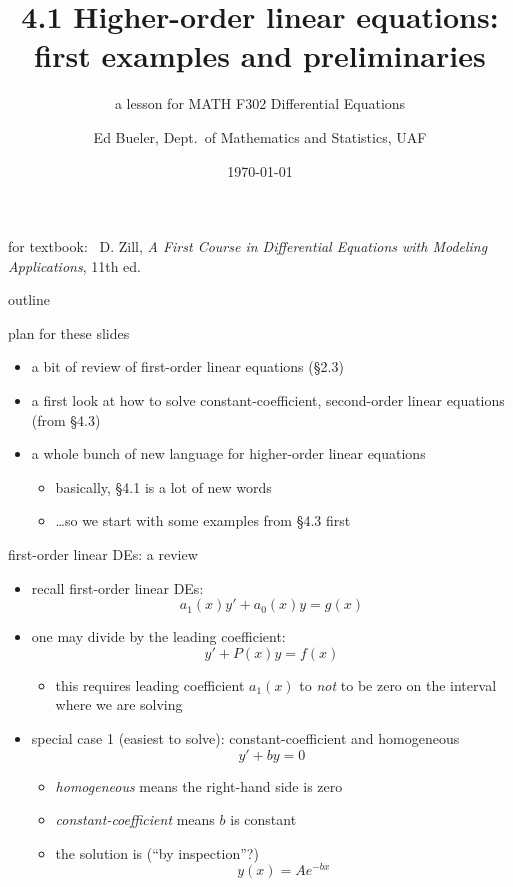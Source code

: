 \documentclass{beamer}
\title{4.1 Higher-order linear equations: \\ first examples and preliminaries}
\subtitle{a lesson for MATH F302 Differential Equations}
\author{Ed Bueler, Dept.~of Mathematics and Statistics, UAF}
\date{\tiny \today}
\begin{document}


\begin{frame}
\titlepage

\centerline{\tiny for textbook: \, D. Zill, \emph{A First Course in Differential Equations with Modeling Applications}, 11th ed.}
\end{frame}


\begin{frame}{outline}

plan for these slides
\begin{itemize}
\item a bit of review of first-order linear equations (\S2.3)
\item a first look at how to solve constant-coefficient, second-order linear equations (from \S4.3)
\item a whole bunch of new language for higher-order linear equations
    \begin{itemize}
    \item basically, \S4.1 is a lot of new words
    \item \dots so we start with some examples from \S4.3 first
    \end{itemize}
\end{itemize}
\end{frame}


\begin{frame}{first-order linear DEs: a review}

\begin{itemize}
\item recall first-order linear DEs:
    $$a_1(x) y' + a_0(x) y = g(x)$$
\item one may divide by the leading coefficient:
    $$y' + P(x) y = f(x)$$

    \begin{itemize}
    \item \alert{this requires leading coefficient $a_1(x)$ to \emph{not} to be zero} on the interval where we are solving
    \end{itemize}
\item special case 1 (\alert{easiest to solve}): constant-coefficient and homogeneous
    $$y' + b y = 0$$

    \begin{itemize}
    \item \emph{homogeneous} means the right-hand side is zero
    \item \emph{constant-coefficient} means $b$ is constant
    \item the solution is (``by inspection''?)
        $$y(x) = A e^{-bx}$$
    \end{itemize}
\end{itemize}
\end{frame}
\end{document}

